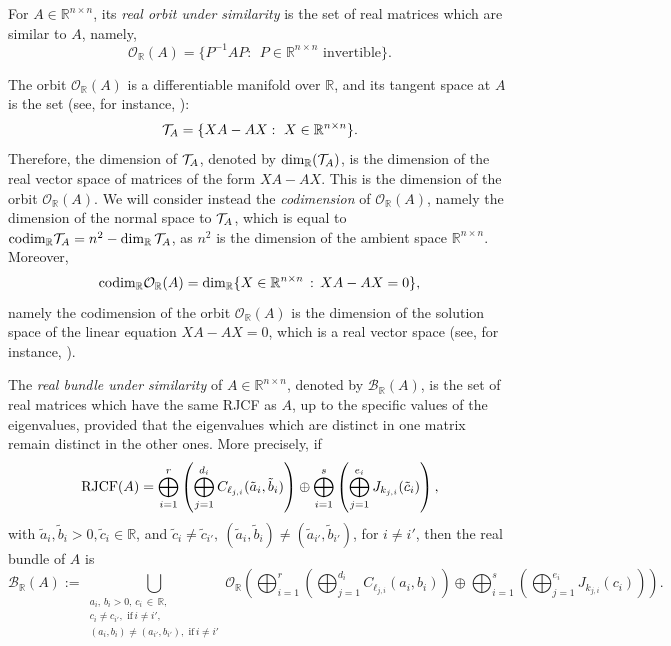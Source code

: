 \documentclass[a4paper]{article}
\newcommand{\R}{\mathbb R}
\newcommand{\cT}{{\cal T}}
\newcommand{\orbr}{{\mathcal O}_{\R}}
\newcommand{\bunr}{{\mathcal B}_{\R}}
\newcommand{\cod}{{\rm codim}_\R}
\begin{document}
For $A\in\R^{n\times n}$, its {\em real orbit under similarity} is the set of real matrices which are similar to $A$, namely,
\begin{equation}\label{orbit}
    \orbr(A)=\{P^{-1}AP:\ \ \mbox{$P\in\R^{n\times n}$ invertible}\}.
\end{equation}

The orbit $\orbr(A)$ is a differentiable manifold over $\R$, and its tangent space at $A$ is the set (see, for instance, \cite[\S 4.1]{de95}):
$$
{\cal T}_A=\{XA-AX:\ X\in\R^{n\times n}\}.
$$
Therefore, the dimension of $\cT_A$, denoted by $\dim_\R(\cT_A)$, is the dimension of the  real vector space of matrices of the form $XA-AX$. This is the dimension of the orbit $\orbr(A)$. We will consider instead the {\em codimension} of $\orbr(A)$, namely the dimension of the normal space to $\cT_A$, which is equal to $\cod\cT_A=n^2-\dim_\R\cT_A$, as $n^2$ is the dimension of the ambient space $\R^{n\times n}$. Moreover,
\begin{equation} \label{eq.codimorb}
\cod\orbr(A)=\dim_\R\{X\in\R^{n\times n} \, : \, XA-AX=0  \},
\end{equation}
namely the codimension of the orbit $\orbr(A)$ is the dimension of the solution space of the linear equation $XA-AX=0$, which is a real vector space (see, for instance, \cite[p. 71]{de95}).

The {\em real bundle under similarity} of $A\in\R^{n\times n}$, denoted by $\bunr(A)$, is the set of real matrices which have the same RJCF as $A$, up to the specific values of the eigenvalues, provided that the eigenvalues which are distinct in one matrix remain distinct in the other ones. More precisely, if
\begin{equation}\label{rjcf}
    {\rm RJCF}(A)=\bigoplus_{i=1}^r\left(\bigoplus_{j=1}^{d_i}C_{\ell_{j,i}}(\tilde a_i, \tilde b_i)\right)\oplus\bigoplus_{i=1}^s\left(\bigoplus_{j=1}^{e_i} J_{k_{j,i}}(\tilde c_i)\right),
\end{equation}
with $\tilde a_i,\tilde b_i >0, \tilde c_i \in \mathbb{R}$, and $\tilde c_i\neq \tilde c_{i'},\  (\tilde a_i, \tilde b_i) \neq (\tilde a_{i'}, \tilde b_{i'})$, for $i\neq i'$, then the real bundle of $A$ is
\begin{equation} \label{bundle}
    \bunr(A):= \bigcup_{\substack{a_i, \, b_i>0, \, c_i \, \in \, \R , \\ c_i\neq c_{i'}, \, \, \mathrm{if} \, i\ne i', \\ (a_i,b_i) \neq (a_{i'}, b_{i'}) , \, \, \mathrm{if} \, i\ne i'} }  \orbr
    \left(\bigoplus_{i=1}^r\left(\bigoplus_{j=1}^{d_i}C_{\ell_{j,i}}(a_i,b_i)\right)\oplus\bigoplus_{i=1}^s\left(\bigoplus_{j=1}^{e_i} J_{k_{j,i}}(c_i)\right)\right).
\end{equation}
\end{document}
